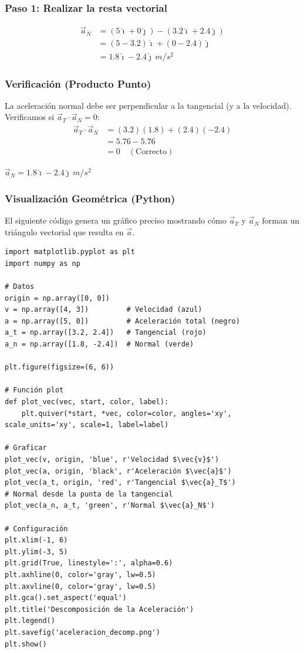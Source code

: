 \documentclass[12pt, a4paper]{article}
\begin{document}
\subsubsection*{Paso 1: Realizar la resta vectorial}
\begin{align*}
\vec{a}_N &= (5\hat{\imath} + 0\hat{\jmath}) - (3.2\hat{\imath} + 2.4\hat{\jmath}) \\
&= (5 - 3.2)\hat{\imath} + (0 - 2.4)\hat{\jmath} \\
&= 1.8\hat{\imath} - 2.4\hat{\jmath} \, \si{m/s^2}
\end{align*}

\subsubsection*{Verificación (Producto Punto)}
La aceleración normal debe ser perpendicular a la tangencial (y a la velocidad). Verificamos si $\vec{a}_T \cdot \vec{a}_N = 0$:
\begin{align*}
\vec{a}_T \cdot \vec{a}_N &= (3.2)(1.8) + (2.4)(-2.4) \\
&= 5.76 - 5.76 \\
&= 0 \quad (\text{Correcto})
\end{align*}

\begin{tcolorbox}[colback=blue!5!white, colframe=blue!75!black, title=Respuesta Final]
\centering
\Large $\vec{a}_N = 1.8\hat{\imath} - 2.4\hat{\jmath} \, \si{m/s^2}$
\end{tcolorbox}

\subsubsection*{Visualización Geométrica (Python)}
El siguiente código genera un gráfico preciso mostrando cómo $\vec{a}_T$ y $\vec{a}_N$ forman un triángulo vectorial que resulta en $\vec{a}$.

\begin{verbatim}
import matplotlib.pyplot as plt
import numpy as np

# Datos
origin = np.array([0, 0])
v = np.array([4, 3])         # Velocidad (azul)
a = np.array([5, 0])         # Aceleración total (negro)
a_t = np.array([3.2, 2.4])   # Tangencial (rojo)
a_n = np.array([1.8, -2.4])  # Normal (verde)

plt.figure(figsize=(6, 6))

# Función plot
def plot_vec(vec, start, color, label):
    plt.quiver(*start, *vec, color=color, angles='xy', scale_units='xy', scale=1, label=label)

# Graficar
plot_vec(v, origin, 'blue', r'Velocidad $\vec{v}$')
plot_vec(a, origin, 'black', r'Aceleración $\vec{a}$')
plot_vec(a_t, origin, 'red', r'Tangencial $\vec{a}_T$')
# Normal desde la punta de la tangencial
plot_vec(a_n, a_t, 'green', r'Normal $\vec{a}_N$')

# Configuración
plt.xlim(-1, 6)
plt.ylim(-3, 5)
plt.grid(True, linestyle=':', alpha=0.6)
plt.axhline(0, color='gray', lw=0.5)
plt.axvline(0, color='gray', lw=0.5)
plt.gca().set_aspect('equal')
plt.title('Descomposición de la Aceleración')
plt.legend()
plt.savefig('aceleracion_decomp.png')
plt.show()
\end{verbatim}
\end{document}
